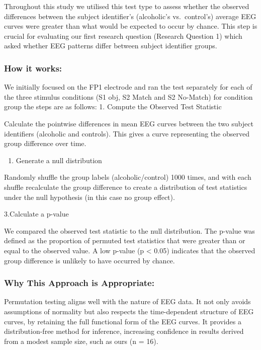 \documentclass{article}
\providecommand{\tightlist}{%
  \setlength{\itemsep}{0pt}\setlength{\parskip}{0pt}}
\begin{document}
Throughout this study we utilised this test type to assess whether the
observed differences between the subject identifier's (alcoholic's
vs.~control's) average EEG curves were greater than what would be
expected to occur by chance. This step is crucial for evaluating our
first research question (Research Question 1) which asked whether EEG
patterns differ between subject identifier groups.

\subsubsection{How it works:}\label{how-it-works}

We initially focused on the FP1 electrode and ran the test separately
for each of the three stimulus conditions (S1 obj, S2 Match and S2
No-Match) for condition group the steps are as follows: 1. Compute the
Observed Test Statistic

Calculate the pointwise differences in mean EEG curves between the two
subject identifiers (alcoholic and controls). This gives a curve
representing the observed group difference over time.

\begin{enumerate}
\def\labelenumi{\arabic{enumi}.}
\setcounter{enumi}{1}
\tightlist
\item
  Generate a null distribution
\end{enumerate}

Randomly shuffle the group labels (alcoholic/control) 1000 times, and
with each shuffle recalculate the group difference to create a
distribution of test statistics under the null hypothesis (in this case
no group effect).

3.Calculate a p-value

We compared the observed test statistic to the null distribution. The
p-value was defined as the proportion of permuted test statistics that
were greater than or equal to the observed value. A low p-value (p
\textless{} 0.05) indicates that the observed group difference is
unlikely to have occurred by chance.

\subsubsection{Why This Approach is
Appropriate:}\label{why-this-approach-is-appropriate}

Permutation testing aligns well with the nature of EEG data. It not only
avoids assumptions of normality but also respects the time-dependent
structure of EEG curves, by retaining the full functional form of the
EEG curves. It provides a distribution-free method for inference,
increasing confidence in results derived from a modest sample size, such
as ours (n = 16).
\end{document}
